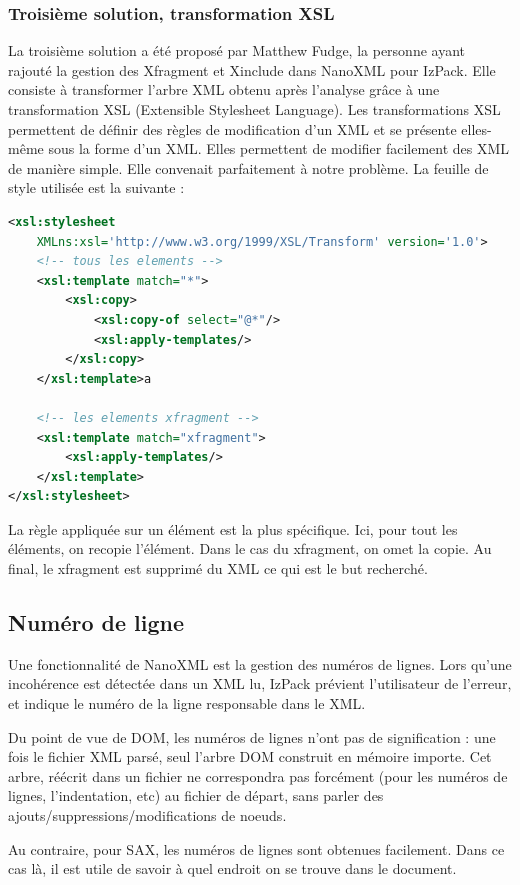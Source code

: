 \subsubsection{Troisième solution, transformation XSL}
La troisième solution a été proposé par Matthew Fudge, la personne ayant rajouté la gestion des Xfragment et Xinclude dans NanoXML pour IzPack.
Elle consiste à transformer l'arbre XML obtenu après l'analyse grâce à une transformation XSL (Extensible Stylesheet Language).
Les transformations XSL permettent de définir des règles de modification d'un XML et se présente elles-même sous la forme d'un XML.
Elles permettent de modifier facilement des XML de manière simple.
Elle convenait parfaitement à notre problème.
La feuille de style utilisée est la suivante :
\begin{lstlisting}[language=XML]
<xsl:stylesheet 
	XMLns:xsl='http://www.w3.org/1999/XSL/Transform' version='1.0'>
    <!-- tous les elements -->
    <xsl:template match="*">
        <xsl:copy>
            <xsl:copy-of select="@*"/>
            <xsl:apply-templates/>
        </xsl:copy>
    </xsl:template>a

    <!-- les elements xfragment -->
    <xsl:template match="xfragment">
        <xsl:apply-templates/>
    </xsl:template>
</xsl:stylesheet>
\end{lstlisting}

La règle appliquée sur un élément est la plus spécifique.
Ici, pour tout les éléments, on recopie l'élément.
Dans le cas du xfragment, on omet la copie.
Au final, le xfragment est supprimé du XML ce qui est le but recherché.
\subsection{Numéro de ligne}
Une fonctionnalité de NanoXML est la gestion des numéros de lignes.
Lors qu'une incohérence est détectée dans un XML lu, IzPack prévient l'utilisateur de l'erreur, et indique le numéro de la ligne responsable dans le XML.

Du point de vue de DOM, les numéros de lignes n'ont pas de signification : une fois le fichier XML parsé, seul l'arbre DOM construit en mémoire importe.
Cet arbre, réécrit dans un fichier ne correspondra pas forcément (pour les numéros de lignes, l'indentation, etc) au fichier de départ, sans parler des ajouts/suppressions/modifications de noeuds.

Au contraire, pour SAX, les numéros de lignes sont obtenues facilement.
Dans ce cas là, il est utile de savoir à quel endroit on se trouve dans le document.

